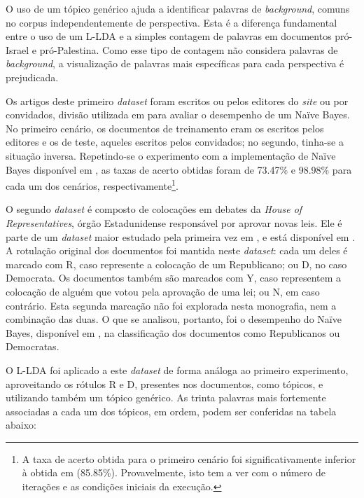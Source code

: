 O uso de um tópico genérico ajuda a identificar palavras de \emph{background}, comuns no corpus independentemente de perspectiva. Esta é a diferença fundamental entre o uso de um L-LDA e a simples contagem de palavras em documentos pró-Israel e pró-Palestina. Como esse tipo de contagem não considera palavras de \emph{background}, a visualização de palavras mais específicas para cada perspectiva é prejudicada.

Os artigos deste primeiro \emph{dataset} foram escritos ou pelos editores do \emph{site} ou por convidados, divisão utilizada em \cite{lin-et-al2006} para avaliar o desempenho de um Naïve Bayes. No primeiro cenário, os documentos de treinamento eram os escritos pelos editores e os de teste, aqueles escritos pelos convidados; no segundo, tinha-se a situação inversa. Repetindo-se o experimento com a implementação de Naïve Bayes disponível em \cite{alibezz-nb}, as taxas de acerto obtidas foram de 73.47\% e 98.98\% para cada um dos cenários, respectivamente\footnote{A taxa de acerto obtida para o primeiro cenário foi significativamente inferior à obtida em \cite{lin-et-al2006} (85.85\%). Provavelmente, isto tem a ver com o número de iterações e as condições iniciais da execução.}. 

O segundo \emph{dataset} é composto de colocações em debates da \emph{House of Representatives}, órgão Estadunidense responsável por aprovar novas leis. Ele é parte de um \emph{dataset} maior estudado pela primeira vez em \cite{thomas-pang-lee}, e está disponível em \cite{alibezz-convote}. A rotulação original dos documentos foi mantida neste \emph{dataset}: cada um deles é marcado com R, caso represente a colocação de um Republicano; ou D, no caso Democrata. Os documentos também são marcados com Y, caso representem a colocação de alguém que votou pela aprovação de uma lei; ou N, em caso contrário. Esta segunda marcação não foi explorada nesta monografia, nem a combinação das duas. O que se analisou, portanto, foi o desempenho do Naïve Bayes, disponível em \cite{alibezz-nb}, na classificação dos documentos como Republicanos ou Democratas.

O L-LDA foi aplicado a este \emph{dataset} de forma análoga ao primeiro experimento, aproveitando os rótulos R e D, presentes nos documentos, como tópicos, e utilizando também um tópico genérico. As trinta palavras mais fortemente associadas a cada um dos tópicos, em ordem, podem ser conferidas na tabela abaixo:

